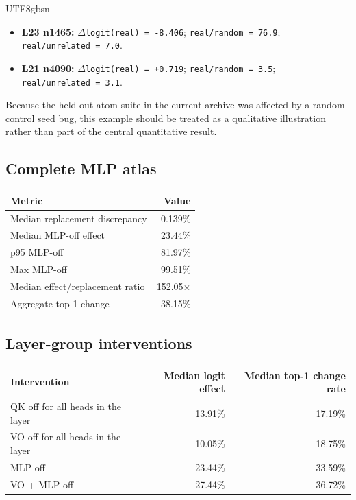 \documentclass[11pt]{article}
\providecommand{\tightlist}{\setlength{\itemsep}{0pt}\setlength{\parskip}{0pt}}
\begin{document}
\begin{CJK*}{UTF8}{gbsn}
\begin{itemize}
\tightlist
\item
  \textbf{L23 n1465:} \texttt{$\Delta$logit(real)\ =\ -8.406};
  \texttt{real/random\ =\ 76.9}; \texttt{real/unrelated\ =\ 7.0}.
\item
  \textbf{L21 n4090:} \texttt{$\Delta$logit(real)\ =\ +0.719};
  \texttt{real/random\ =\ 3.5}; \texttt{real/unrelated\ =\ 3.1}.
\end{itemize}

Because the held-out atom suite in the current archive was affected by a
random-control seed bug, this example should be treated as a qualitative
illustration rather than part of the central quantitative result.

\subsection{Complete MLP atlas}

\begin{center}
\small
\begin{tabular}{@{}lr@{}}
\toprule
Metric & Value \\
\midrule
Median replacement discrepancy & 0.139\% \\
Median MLP-off effect & 23.44\% \\
p95 MLP-off & 81.97\% \\
Max MLP-off & 99.51\% \\
Median effect/replacement ratio & 152.05$\times$ \\
Aggregate top-1 change & 38.15\% \\
\bottomrule
\end{tabular}
\end{center}

\subsection{Layer-group
interventions}

\begin{center}
\small
\begin{tabular}{@{}lrr@{}}
\toprule
Intervention & Median logit effect & Median top-1 change rate \\
\midrule
QK off for all heads in the layer & 13.91\% & 17.19\% \\
VO off for all heads in the layer & 10.05\% & 18.75\% \\
MLP off & 23.44\% & 33.59\% \\
VO + MLP off & 27.44\% & 36.72\% \\
\bottomrule
\end{tabular}
\end{center}


\end{CJK*}
\end{document}
